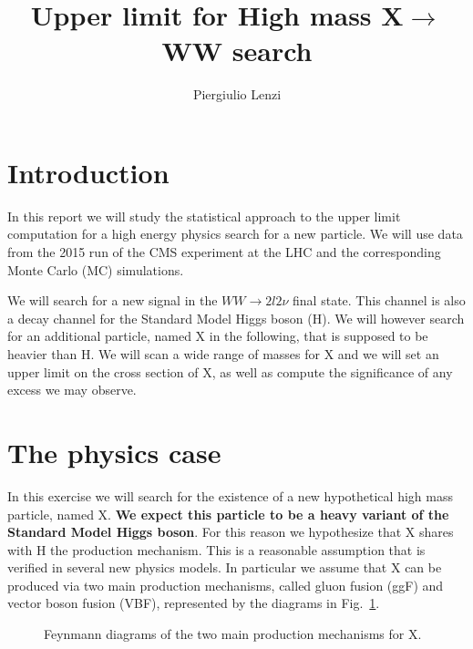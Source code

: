 \documentclass[a4paper,12pt]{article}
\title{Upper limit for High mass X$\rightarrow$WW search}
\author{Piergiulio Lenzi}
\begin{document}
\maketitle

\begin{abstract}
\end{abstract}

\section{Introduction}
In this report we will study the statistical approach to the upper limit
computation for a high energy physics search for a new particle.  We will use
data from the 2015 run of the CMS experiment at the LHC and the corresponding
Monte Carlo (MC) simulations.

We will search for a new signal in the $WW\rightarrow{}2l2\nu$ final state.
This channel is also a decay channel for the Standard Model Higgs boson (H).
We will however search for an additional particle, named X in the following,
that is supposed to be heavier than H. 
We will scan a wide range of masses for X and we will set an upper limit on
the  cross section of X, as well as compute the significance of any excess we
may observe.

\section{The physics case}
In this exercise we will search for the existence of a new hypothetical high
mass particle, named X. {\bf We expect this particle to be a heavy variant of
the Standard Model Higgs boson}.  For this reason we hypothesize that X shares
with H the production mechanism. This is a reasonable assumption that is
verified in several new physics models.
In particular we assume that X can be produced via two main production
mechanisms, called gluon fusion (ggF) and vector boson fusion (VBF),
represented by the diagrams in Fig.~\ref{fig:prod}.  \begin{figure}
 \centering
 \caption{Feynmann diagrams of the two main production mechanisms for X.\label{fig:prod}}
\end{figure}
\end{document}
